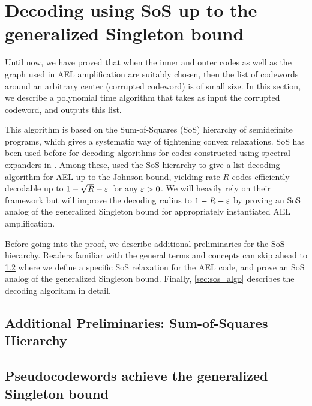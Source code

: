 \section{Decoding using SoS up to the generalized Singleton bound}

Until now, we have proved that when the inner and outer codes as well as the graph used in AEL amplification are suitably chosen, then the list of codewords around an arbitrary center (corrupted codeword) is of small size. 
In this section, we describe a polynomial time algorithm that takes as input the corrupted codeword, and outputs this list. 


This algorithm is based on the Sum-of-Squares (SoS) hierarchy of semidefinite programs, which gives a systematic way of tightening convex relaxations.  SoS has been used before for decoding algorithms for codes constructed using spectral expanders in \cite{AJQST20, JQST20, RR23, JST23}. 
Among these, \cite{JST23} used the SoS hierarchy to give a list decoding algorithm for AEL up to the Johnson bound, yielding rate $R$ codes efficiently decodable up to $1-\sqrt{R}-\varepsilon$ for any $\varepsilon>0$. 
We will heavily rely on their framework but will improve the decoding radius to $1-R-\varepsilon$ by proving an SoS analog of the generalized Singleton bound for appropriately instantiated AEL amplification.

%
Before going into the proof, we describe additional preliminaries for the SoS hierarchy. Readers familiar with the general terms and concepts can skip ahead to \cref{sec:sos_proof} where we define a specific SoS relaxation for the AEL code, and prove an SoS analog of the generalized Singleton bound. Finally, \cref{sec:sos_algo} describes the decoding algorithm in detail.


\subsection{Additional Preliminaries: Sum-of-Squares Hierarchy}\label{sec:sos_prelims}


\subsection{Pseudocodewords achieve the generalized Singleton bound}\label{sec:sos_proof}

